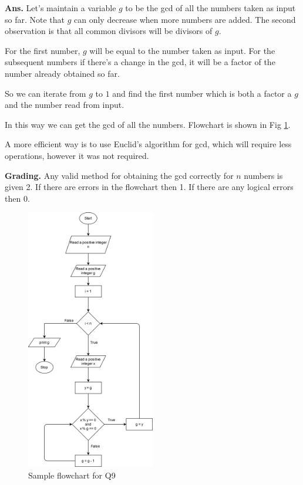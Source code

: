 \documentclass{article}
\begin{document}
    \begin{flushleft}
    
    \textbf{Ans. } Let's maintain a variable $g$ to be the gcd of all the numbers
    taken as input so far. Note that $g$ can only decrease when more numbers are 
    added. The second observation is that all common divisors will be divisors 
    of $g$.

    For the first number, $g$ will be equal to the number taken as input.
    For the subsequent numbers if there's a change in the gcd, it will be a 
    factor of the number already obtained so far. 

    So we can iterate from $g$ to $1$ and find the first number which is both 
    a factor a $g$ and the number read from input. 

    In this way we can get the gcd of all the numbers. 
    Flowchart is shown in Fig \ref{Q9}.

    A more efficient way is to use Euclid's algorithm for gcd, which will 
    require less operations, however it was not required.
    
    \end{flushleft}
    
    \begin{flushleft}
    
    \textbf{Grading. } Any valid method for obtaining the gcd correctly for 
    $n$ numbers is given 2. If there are errors in the flowchart then 1. 
    If there are any logical errors then 0.
    
    \end{flushleft}
    
    \begin{figure}[ht]
        \centering
        \includegraphics[width=0.5\textwidth]{Q9.png}
        \caption{Sample flowchart for Q9}
        \label{Q9}
    \end{figure}
    
\end{document}
